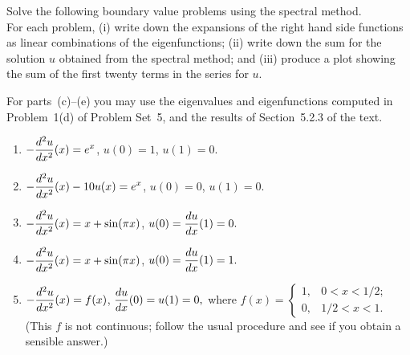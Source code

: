 Solve the following boundary value problems using the spectral method.\\
For each problem, (i) write down the expansions of the right hand side
functions as linear combinations of the eigenfunctions; 
(ii) write down the sum for the solution $u$ obtained from the spectral method;
and (iii) produce a plot showing the sum of the first twenty terms in the series for $u$.

For parts~(c)--(e) you may use the eigenvalues and eigenfunctions
computed in Problem~1(d) of Problem Set~5, and the results of Section~5.2.3
of the text.  

\begin{enumerate}
\item $\displaystyle{-{d^2 u \over dx^2}(x) = e^x}$, 
      \quad $u(0) = 1$, $u(1) = 0$.\\[0.25em]
\item $\displaystyle{-{d^2 u \over dx^2}(x) - 10 u(x) = e^x}$, 
      \quad $u(0) = 0$, $u(1) = 0$.\\[0.25em]
\item $\displaystyle{-{d^2 u \over dx^2}(x) = x + \sin(\pi x)}$, 
      \quad $\displaystyle{u(0) = {du\over dx}(1) = 0.}$ \\[0.25em]
\item $\displaystyle{-{d^2 u \over dx^2}(x) = x + \sin(\pi x)}$, 
      \quad $\displaystyle{u(0) = {du\over dx}(1) = 1.}$ \\[0.25em]
\item $\displaystyle{-{d^2 u \over dx^2}(x) = f(x)}$, 
      \quad $\displaystyle{{du\over dx}(0) = u(1) = 0,}$ 
      where $\displaystyle{f(x) 
             = \left\{ \begin{array}{ll} 1, & 0<x<1/2;\\ 
                                         0, & 1/2<x<1.
                \end{array}\right.}$ \\[0.25em]
      (This $f$ is not continuous; follow the usual procedure and
       see if you obtain a sensible answer.)
       
\end{enumerate}



